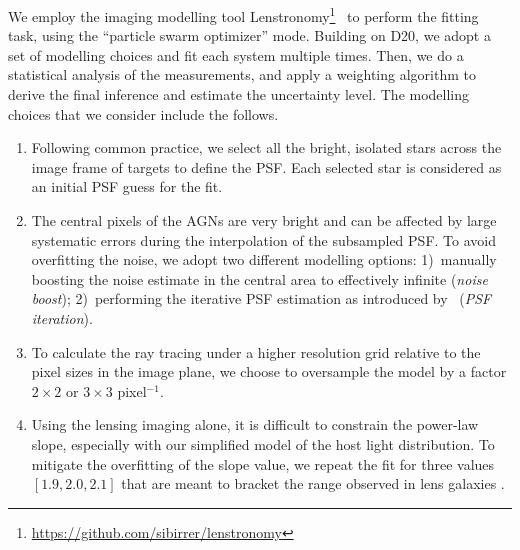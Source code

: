 \documentclass[fleqn,usenatbib]{mnras}
\newcommand{\lenstronomy}{{\sc Lenstronomy}}
\begin{document}
We employ the imaging modelling tool \lenstronomy\footnote{\url{https://github.com/sibirrer/lenstronomy}}~\citep{lenstronomy} to perform the fitting task, using the ``particle swarm optimizer'' mode. Building on D20, we adopt a set of  modelling choices and fit each system multiple times. Then, we do a statistical analysis of the measurements, and apply a weighting algorithm to derive the final inference and estimate the uncertainty level. The modelling choices that we consider include the follows.
\begin{enumerate}
\item Following common practice, we select all the bright, isolated stars across the image frame of targets to define the PSF. Each selected star is considered as an initial PSF guess for the fit.
\item The central pixels of the AGNs are very bright and can be affected by large systematic errors during the interpolation of the subsampled PSF. To avoid overfitting the noise, we adopt two different modelling options: 1)~manually boosting the noise estimate in the central area to effectively infinite ({\it noise boost}); 2)~performing the iterative PSF estimation as introduced by~\citet{Chen2016, Birrer2019} ({\it PSF iteration}).
\item To calculate the ray tracing under a higher resolution grid relative to the pixel sizes in the image plane, we choose to oversample the model by a factor  $2\times2$ or $3\times3$ pixel$^{-1}$.
\item Using the lensing imaging alone, it is difficult to constrain the power-law slope, especially with our simplified model of the host light distribution. To mitigate the overfitting of the slope value, we repeat the fit for three values $[1.9, 2.0, 2.1]$ that are meant to bracket the range observed in lens galaxies \citep[e.g.,][]{Koopmans2006, Auger2010}.
\end{enumerate}
\end{document}
